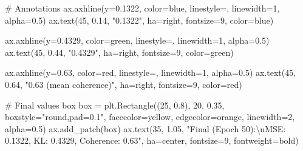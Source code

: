 \documentclass[
  letterpaper,
  DIV=11,
  numbers=noendperiod]{scrartcl}
\newenvironment{Shaded}{\begin{snugshade}}{\end{snugshade}}
\newcommand{\CharTok}[1]{\textcolor[rgb]{0.13,0.47,0.30}{#1}}
\newcommand{\CommentTok}[1]{\textcolor[rgb]{0.37,0.37,0.37}{#1}}
\newcommand{\DecValTok}[1]{\textcolor[rgb]{0.68,0.00,0.00}{#1}}
\newcommand{\FloatTok}[1]{\textcolor[rgb]{0.68,0.00,0.00}{#1}}
\newcommand{\NormalTok}[1]{\textcolor[rgb]{0.00,0.23,0.31}{#1}}
\newcommand{\OperatorTok}[1]{\textcolor[rgb]{0.37,0.37,0.37}{#1}}
\newcommand{\StringTok}[1]{\textcolor[rgb]{0.13,0.47,0.30}{#1}}
\begin{document}
\begin{Shaded}
\begin{Highlighting}[]
\CommentTok{\# Annotations}
\NormalTok{ax.axhline(y}\OperatorTok{=}\FloatTok{0.1322}\NormalTok{, color}\OperatorTok{=}\StringTok{\textquotesingle{}blue\textquotesingle{}}\NormalTok{, linestyle}\OperatorTok{=}\StringTok{\textquotesingle{}{-}{-}\textquotesingle{}}\NormalTok{, linewidth}\OperatorTok{=}\DecValTok{1}\NormalTok{, alpha}\OperatorTok{=}\FloatTok{0.5}\NormalTok{)}
\NormalTok{ax.text(}\DecValTok{45}\NormalTok{, }\FloatTok{0.14}\NormalTok{, }\StringTok{"0.1322"}\NormalTok{, ha}\OperatorTok{=}\StringTok{\textquotesingle{}right\textquotesingle{}}\NormalTok{, fontsize}\OperatorTok{=}\DecValTok{9}\NormalTok{, color}\OperatorTok{=}\StringTok{\textquotesingle{}blue\textquotesingle{}}\NormalTok{)}

\NormalTok{ax.axhline(y}\OperatorTok{=}\FloatTok{0.4329}\NormalTok{, color}\OperatorTok{=}\StringTok{\textquotesingle{}green\textquotesingle{}}\NormalTok{, linestyle}\OperatorTok{=}\StringTok{\textquotesingle{}{-}{-}\textquotesingle{}}\NormalTok{, linewidth}\OperatorTok{=}\DecValTok{1}\NormalTok{, alpha}\OperatorTok{=}\FloatTok{0.5}\NormalTok{)}
\NormalTok{ax.text(}\DecValTok{45}\NormalTok{, }\FloatTok{0.44}\NormalTok{, }\StringTok{"0.4329"}\NormalTok{, ha}\OperatorTok{=}\StringTok{\textquotesingle{}right\textquotesingle{}}\NormalTok{, fontsize}\OperatorTok{=}\DecValTok{9}\NormalTok{, color}\OperatorTok{=}\StringTok{\textquotesingle{}green\textquotesingle{}}\NormalTok{)}

\NormalTok{ax.axhline(y}\OperatorTok{=}\FloatTok{0.63}\NormalTok{, color}\OperatorTok{=}\StringTok{\textquotesingle{}red\textquotesingle{}}\NormalTok{, linestyle}\OperatorTok{=}\StringTok{\textquotesingle{}{-}{-}\textquotesingle{}}\NormalTok{, linewidth}\OperatorTok{=}\DecValTok{1}\NormalTok{, alpha}\OperatorTok{=}\FloatTok{0.5}\NormalTok{)}
\NormalTok{ax.text(}\DecValTok{45}\NormalTok{, }\FloatTok{0.64}\NormalTok{, }\StringTok{"0.63 (mean coherence)"}\NormalTok{, ha}\OperatorTok{=}\StringTok{\textquotesingle{}right\textquotesingle{}}\NormalTok{, fontsize}\OperatorTok{=}\DecValTok{9}\NormalTok{, color}\OperatorTok{=}\StringTok{\textquotesingle{}red\textquotesingle{}}\NormalTok{)}

\CommentTok{\# Final values box}
\NormalTok{box }\OperatorTok{=}\NormalTok{ plt.Rectangle((}\DecValTok{25}\NormalTok{, }\FloatTok{0.8}\NormalTok{), }\DecValTok{20}\NormalTok{, }\FloatTok{0.35}\NormalTok{, boxstyle}\OperatorTok{=}\StringTok{"round,pad=0.1"}\NormalTok{,}
\NormalTok{                    facecolor}\OperatorTok{=}\StringTok{\textquotesingle{}yellow\textquotesingle{}}\NormalTok{, edgecolor}\OperatorTok{=}\StringTok{\textquotesingle{}orange\textquotesingle{}}\NormalTok{, linewidth}\OperatorTok{=}\DecValTok{2}\NormalTok{, alpha}\OperatorTok{=}\FloatTok{0.5}\NormalTok{)}
\NormalTok{ax.add\_patch(box)}
\NormalTok{ax.text(}\DecValTok{35}\NormalTok{, }\FloatTok{1.05}\NormalTok{, }\StringTok{"Final (Epoch 50):}\CharTok{\textbackslash{}n}\StringTok{MSE: 0.1322, KL: 0.4329, Coherence: 0.63"}\NormalTok{,}
\NormalTok{        ha}\OperatorTok{=}\StringTok{\textquotesingle{}center\textquotesingle{}}\NormalTok{, fontsize}\OperatorTok{=}\DecValTok{9}\NormalTok{, fontweight}\OperatorTok{=}\StringTok{\textquotesingle{}bold\textquotesingle{}}\NormalTok{)}


\end{Highlighting}
\end{Shaded}
\end{document}
